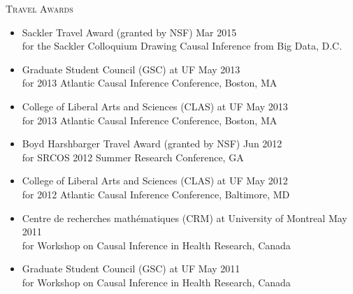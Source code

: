 \documentclass[10pt]{article}
\newenvironment{innerlist}[1][\enskip\textbullet]%
        {\begin{itemize}[#1,leftmargin=*,parsep=0pt,itemsep=0pt,topsep=0pt,partopsep=0pt]}
        {\end{itemize}}
\begin{document}
\textsc{Travel Awards}
\begin{innerlist}
\item[] Sackler Travel Award (granted by NSF) \hfill Mar 2015\\ for
  the Sackler Colloquium Drawing Causal Inference from Big Data,
  D.C. \\ 
\item[] Graduate Student Council (GSC) at UF \hfill
  May 2013
\\for 2013 Atlantic
  Causal Inference Conference, Boston, MA \\ 
\item[] College of Liberal Arts and Sciences (CLAS) at UF \hfill May 2013\\for 2013 Atlantic
  Causal Inference Conference, Boston, MA \\ 
\item[] Boyd Harshbarger Travel Award (granted by NSF) \hfill Jun 2012\\ for SRCOS 2012 Summer Research
  Conference, GA \\ 
\item[] College of Liberal Arts and Sciences (CLAS) at UF \hfill May 2012\\ for
  2012 Atlantic Causal Inference Conference, Baltimore, MD \\ 
\item[] Centre de recherches math{\'e}matiques (CRM) at University of Montreal 
  \hfill May 2011\\for Workshop on Causal Inference in Health
  Research, Canada \\ 
\item[] Graduate Student Council (GSC) at UF 
  \hfill May 2011\\for Workshop on Causal Inference in Health
  Research, Canada

\end{innerlist}
\end{document}
